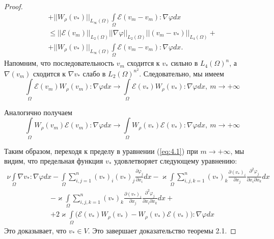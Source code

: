 \begin{proof}
\begin{equation*}
\begin{gathered}
            + ||W_\rho(v_*)||_{L_\infty(\Omega)} \int\limits_{\Omega}\mathcal{E}(v_m - v_m): \nabla\varphi dx\\
            \leq ||\mathcal{E}(v_m)||_{L_2(\Omega)}||\nabla\varphi||_{L_2(\Omega)}||(v_m - v_*)||_{L_4(\Omega)} +\\
            + ||W_\rho(v_*)||_{L_\infty(\Omega)} \int\limits_{\Omega}\mathcal{E}(v_m - v_m): \nabla\varphi dx.
        \end{gathered}
    \end{equation*}
    Напомним, что последовательность $v_m$ сходится к $v_*$ сильно в $L_4(\Omega)^n$,
    а $\nabla(v_m)$ сходится к $\nabla v_*$ слабо в $L_2(\Omega)^{n^2}$.
    Следовательно, мы имеем
    $$\int\limits_{\Omega}\mathcal{E}(v_m) W_\rho(v_m): \nabla\varphi dx \rightarrow
    \int\limits_{\Omega}\mathcal{E}(v_*) W_\rho(v_*): \nabla\varphi dx, \ m \rightarrow +\infty$$

    Аналогично получаем
    $$\int\limits_{\Omega}W_\rho(v_m)\mathcal{E}(v_m): \nabla\varphi dx \rightarrow
    \int\limits_{\Omega}W_\rho(v_*)\mathcal{E}(v_*): \nabla\varphi dx, \ m \rightarrow +\infty$$

    Таким образом, переходя к пределу в уравнении (\ref{eq:4.1}) при $m \rightarrow +\infty$,
    мы видим, что предельная функция $v_*$ удовлетворяет следующему уравнению:
    \begin{equation*}
        \begin{gathered}
            \nu\int\limits_{\Omega}\nabla v_*: \nabla\varphi dx -
            \int\limits_{\Omega}\sum_{i,j=1}^n (v_*)_i (v_*)_j \frac{\partial \varphi_j}{\partial x_i} dx
            - \varkappa \int\limits_{\Omega}\sum_{i,j,k=1}^n (v_*)_k \frac{\partial (v_*)_i}{\partial x_j}
            \frac{\partial^2 \varphi_j}{\partial x_i \partial x_k} dx
        \end{gathered}
    \end{equation*}
    \begin{equation*}
        \begin{gathered}
            - \varkappa \int\limits_{\Omega}\sum_{i,j,k=1}^n (v_*)_k \frac{\partial (v_*)_i}{\partial x_j}
            \frac{\partial^2 \varphi_j}{\partial x_i \partial x_k} dx + \\ + 2 \varkappa
            \int\limits_{\Omega}\bigg(\mathcal{E}(v_*) W_\rho(v_*) - W_\rho(v_*)\mathcal{E}(v_*)\bigg): \nabla\varphi dx
        \end{gathered}
    \end{equation*}
    Это доказывает, что $v_* \in V$. Это завершает доказательство теоремы 2.1.
\end{proof}
